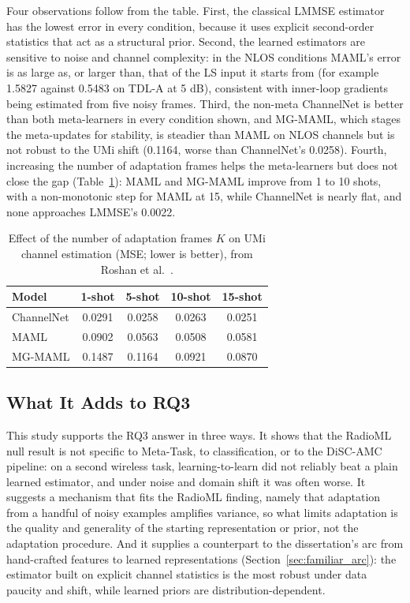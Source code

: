 Four observations follow from the table. First, the classical LMMSE estimator has the lowest error in every condition, because it uses explicit second-order statistics that act as a structural prior. Second, the learned estimators are sensitive to noise and channel complexity: in the NLOS conditions MAML's error is as large as, or larger than, that of the LS input it starts from (for example 1.5827 against 0.5483 on TDL-A at 5 dB), consistent with inner-loop gradients being estimated from five noisy frames. Third, the non-meta ChannelNet is better than both meta-learners in every condition shown, and MG-MAML, which stages the meta-updates for stability, is steadier than MAML on NLOS channels but is not robust to the UMi shift (0.1164, worse than ChannelNet's 0.0258). Fourth, increasing the number of adaptation frames helps the meta-learners but does not close the gap (Table~\ref{tab:channel_est_k}): MAML and MG-MAML improve from 1 to 10 shots, with a non-monotonic step for MAML at 15, while ChannelNet is nearly flat, and none approaches LMMSE's 0.0022.

\begin{table}[htbp]
\centering
\caption{Effect of the number of adaptation frames $K$ on UMi channel estimation (MSE; lower is better), from Roshan et al.~\cite{roshan2026channelestimation}.}
\label{tab:channel_est_k}
\begin{tabular}{lcccc}
\toprule
Model & 1-shot & 5-shot & 10-shot & 15-shot \\
\midrule
ChannelNet & 0.0291 & 0.0258 & 0.0263 & 0.0251 \\
MAML & 0.0902 & 0.0563 & 0.0508 & 0.0581 \\
MG-MAML & 0.1487 & 0.1164 & 0.0921 & 0.0870 \\
\bottomrule
\end{tabular}
\end{table}

\subsection{What It Adds to RQ3}

This study supports the RQ3 answer in three ways. It shows that the RadioML null result is not specific to Meta-Task, to classification, or to the DiSC-AMC pipeline: on a second wireless task, learning-to-learn did not reliably beat a plain learned estimator, and under noise and domain shift it was often worse. It suggests a mechanism that fits the RadioML finding, namely that adaptation from a handful of noisy examples amplifies variance, so what limits adaptation is the quality and generality of the starting representation or prior, not the adaptation procedure. And it supplies a counterpart to the dissertation's arc from hand-crafted features to learned representations (Section~\ref{sec:familiar_arc}): the estimator built on explicit channel statistics is the most robust under data paucity and shift, while learned priors are distribution-dependent.

